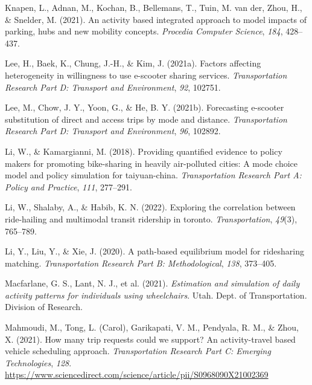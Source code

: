 \documentclass[fancy, masters]{byuthesis}
\newlength{\cslhangindent}
\newlength{\cslentryspacingunit} %
\newenvironment{CSLReferences}[2] %
 {%
  \setlength{\parindent}{0pt}
  \ifodd #1
  \let\oldpar\par
  \def\par{\hangindent=\cslhangindent\oldpar}
  \fi
  \setlength{\parskip}{#2\cslentryspacingunit}
 }%
 {}
\begin{document}
\begin{CSLReferences}{1}{0}
\leavevmode{}%
Knapen, L., Adnan, M., Kochan, B., Bellemans, T., Tuin, M. van der, Zhou, H., \& Snelder, M. (2021). An activity based integrated approach to model impacts of parking, hubs and new mobility concepts. \emph{Procedia Computer Science}, \emph{184}, 428--437.

\leavevmode{}%
Lee, H., Baek, K., Chung, J.-H., \& Kim, J. (2021a). Factors affecting heterogeneity in willingness to use e-scooter sharing services. \emph{Transportation Research Part D: Transport and Environment}, \emph{92}, 102751.

\leavevmode{}%
Lee, M., Chow, J. Y., Yoon, G., \& He, B. Y. (2021b). Forecasting e-scooter substitution of direct and access trips by mode and distance. \emph{Transportation Research Part D: Transport and Environment}, \emph{96}, 102892.

\leavevmode{}%
Li, W., \& Kamargianni, M. (2018). Providing quantified evidence to policy makers for promoting bike-sharing in heavily air-polluted cities: A mode choice model and policy simulation for taiyuan-china. \emph{Transportation Research Part A: Policy and Practice}, \emph{111}, 277--291.

\leavevmode{}%
Li, W., Shalaby, A., \& Habib, K. N. (2022). Exploring the correlation between ride-hailing and multimodal transit ridership in toronto. \emph{Transportation}, \emph{49}(3), 765--789.

\leavevmode{}%
Li, Y., Liu, Y., \& Xie, J. (2020). A path-based equilibrium model for ridesharing matching. \emph{Transportation Research Part B: Methodological}, \emph{138}, 373--405.

\leavevmode{}%
Macfarlane, G. S., Lant, N. J., et al. (2021). \emph{Estimation and simulation of daily activity patterns for individuals using wheelchairs}. Utah. Dept. of Transportation. Division of Research.

\leavevmode{}%
Mahmoudi, M., Tong, L. (Carol), Garikapati, V. M., Pendyala, R. M., \& Zhou, X. (2021). How many trip requests could we support? An activity-travel based vehicle scheduling approach. \emph{Transportation Research Part C: Emerging Technologies}, \emph{128}. \url{https://www.sciencedirect.com/science/article/pii/S0968090X21002369}


\end{CSLReferences}
\end{document}
